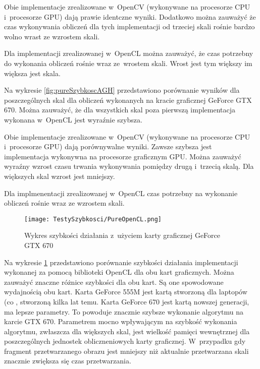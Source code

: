Obie implementacje zrealizowane w~OpenCV (wykonywane na procesorze CPU i~procesorze GPU) dają prawie identczne wyniki. Dodatkowo można zauważyć że czas wykonywania obliczeń dla tych implementacji od trzeciej skali rośnie bardzo wolno wrast ze wzrostem skali.

Dla implementacji zrealizowanej w~OpenCL można zauważyć, że czas potrzebny do wykonania obliczeń rośnie wraz ze~wrostem skali. Wrost jest tym większy im większa jest skala.

Na wykresie \ref{fig:pureSzybkoscAGH} przedstawiono porównanie wyników dla poszczególnych skal dla obliczeń wykonanych na kracie graficznej GeForce GTX 670. Można zauważyć, że dla wszystkich skal poza pierwszą implementacja wykonana w~OpenCL jest wyraźnie szybsza.

Obie implementacje zrealizowane w~OpenCV (wykonywane na procesorze CPU i~procesorze GPU) dają porównywalne wyniki. Zawsze szybsza jest implementacja wykonywna na procesorze graficznym GPU. Można zauważyć wyraźny wzrost czasu trwania wykonywania pomiędzy drugą i~trzecią skalą. Dla większych skal wzrost jest mniejszy. 

Dla implmenentacji zrealizowanej w~OpenCL czas potrzebny na wykonanie obliczeń rośnie wraz ze wzrostem skali. 

\begin{figure}[h]
\begin{center}
\texttt{[image: TestySzybkosci/PureOpenCL.png]}
\end{center}
\caption{Wykres szybkości działania z~użyciem karty graficznej GeForce GTX 670}
\label{fig:pureOpenCL}
\end{figure}

Na wykresie \ref{fig:pureOpenCL} przedstawiono porównanie szybkości działania implementacji wykonanej za pomocą biblioteki OpenCL dla obu kart graficznych. Można zauważyć znaczne różnice szybkości dla obu kart. Są one spowodowane wydajnością obu kart. Karta GeForce 555M jest kartą stworzoną dla laptopów (co , stworzoną kilka lat temu. Karta GeForce 670 jest kartą nowszej generacji, ma lepsze parametry. To powoduje znacznie szybsze wykonanie algorytmu na karcie GTX 670. Parametrem mocno wpływającym na szybkość wykonania algorytmu, zwłaszcza dla większych skal, jest wielkość pamięci wewnętrznej dla poszczególnych jednostek obliczneniowych karty graficznej. W~przypadku gdy fragment przetwarzanego obrazu jest mniejszy niż aktualnie przetwarzana skali znacznie zwiększa się czas przetwarzania.
